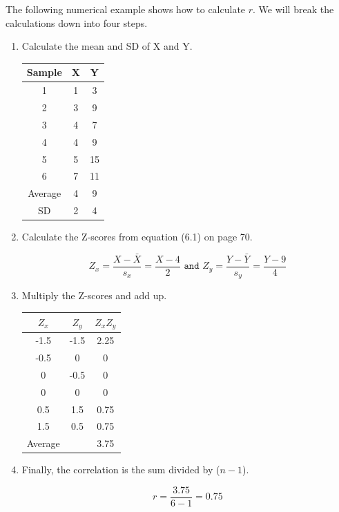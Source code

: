 \documentclass[11pt, chapterprefix=true]{scrbook}\usepackage[]{graphicx}\usepackage[]{color}
\begin{document}
The following numerical example shows how to calculate $r$.  We will break the calculations down into four steps.

\begin{enumerate}
\item Calculate the mean and SD of X and Y.

\begin{table}[ht]
\centering
\begin{tabular}{@{} ccc @{}} \hline
Sample & X & Y \\ \hline
1 & 1 & 3 \\
2 & 3 & 9 \\
3 & 4 & 7 \\
4 & 4 & 9 \\
5 & 5 & 15 \\
6 & 7 & 11 \\ \hline
Average & 4 & 9 \\
SD  & 2 & 4 \\ \hline
\end{tabular}
\end{table}

\item Calculate the Z-scores from equation (6.1) on page 70.  

$$ Z_x = \frac{X - \bar{X}}{s_x} = \frac{X - 4}{2} \texttt{ and } Z_y = \frac{Y - \bar{Y}}{s_y} = \frac{Y - 9}{4} $$

\item Multiply the Z-scores and add up.

\begin{table}[ht]
\centering
\begin{tabular}{@{} ccc @{}} \hline
$Z_x$ & $Z_y$ & $Z_x Z_y$ \\ \hline
-1.5 & -1.5 & 2.25 \\
-0.5 & 0 & 0 \\
0 & -0.5 & 0 \\
0 & 0 & 0 \\
0.5 & 1.5 & 0.75 \\
1.5 & 0.5 & 0.75 \\ \hline
Average &  & 3.75 \\
\end{tabular}
\end{table}

\item Finally, the correlation is the sum divided by ($n - 1$).

$$ r = \frac{3.75}{6 - 1} = 0.75 $$
\end{enumerate}
\end{document}
